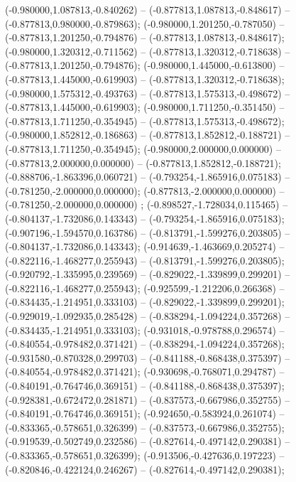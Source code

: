  (-0.980000,1.087813,-0.840262) -- (-0.877813,1.087813,-0.848617) -- (-0.877813,0.980000,-0.879863);
 (-0.980000,1.201250,-0.787050) -- (-0.877813,1.201250,-0.794876) -- (-0.877813,1.087813,-0.848617);
 (-0.980000,1.320312,-0.711562) -- (-0.877813,1.320312,-0.718638) -- (-0.877813,1.201250,-0.794876);
 (-0.980000,1.445000,-0.613800) -- (-0.877813,1.445000,-0.619903) -- (-0.877813,1.320312,-0.718638);
 (-0.980000,1.575312,-0.493763) -- (-0.877813,1.575313,-0.498672) -- (-0.877813,1.445000,-0.619903);
 (-0.980000,1.711250,-0.351450) -- (-0.877813,1.711250,-0.354945) -- (-0.877813,1.575313,-0.498672);
 (-0.980000,1.852812,-0.186863) -- (-0.877813,1.852812,-0.188721) -- (-0.877813,1.711250,-0.354945);
 (-0.980000,2.000000,0.000000) -- (-0.877813,2.000000,0.000000) -- (-0.877813,1.852812,-0.188721);
 (-0.888706,-1.863396,0.060721) -- (-0.793254,-1.865916,0.075183) -- (-0.781250,-2.000000,0.000000);
 (-0.877813,-2.000000,0.000000) -- (-0.781250,-2.000000,0.000000) ;
 (-0.898527,-1.728034,0.115465) -- (-0.804137,-1.732086,0.143343) -- (-0.793254,-1.865916,0.075183);
 (-0.907196,-1.594570,0.163786) -- (-0.813791,-1.599276,0.203805) -- (-0.804137,-1.732086,0.143343);
 (-0.914639,-1.463669,0.205274) -- (-0.822116,-1.468277,0.255943) -- (-0.813791,-1.599276,0.203805);
 (-0.920792,-1.335995,0.239569) -- (-0.829022,-1.339899,0.299201) -- (-0.822116,-1.468277,0.255943);
 (-0.925599,-1.212206,0.266368) -- (-0.834435,-1.214951,0.333103) -- (-0.829022,-1.339899,0.299201);
 (-0.929019,-1.092935,0.285428) -- (-0.838294,-1.094224,0.357268) -- (-0.834435,-1.214951,0.333103);
 (-0.931018,-0.978788,0.296574) -- (-0.840554,-0.978482,0.371421) -- (-0.838294,-1.094224,0.357268);
 (-0.931580,-0.870328,0.299703) -- (-0.841188,-0.868438,0.375397) -- (-0.840554,-0.978482,0.371421);
 (-0.930698,-0.768071,0.294787) -- (-0.840191,-0.764746,0.369151) -- (-0.841188,-0.868438,0.375397);
 (-0.928381,-0.672472,0.281871) -- (-0.837573,-0.667986,0.352755) -- (-0.840191,-0.764746,0.369151);
 (-0.924650,-0.583924,0.261074) -- (-0.833365,-0.578651,0.326399) -- (-0.837573,-0.667986,0.352755);
 (-0.919539,-0.502749,0.232586) -- (-0.827614,-0.497142,0.290381) -- (-0.833365,-0.578651,0.326399);
 (-0.913506,-0.427636,0.197223) -- (-0.820846,-0.422124,0.246267) -- (-0.827614,-0.497142,0.290381);
